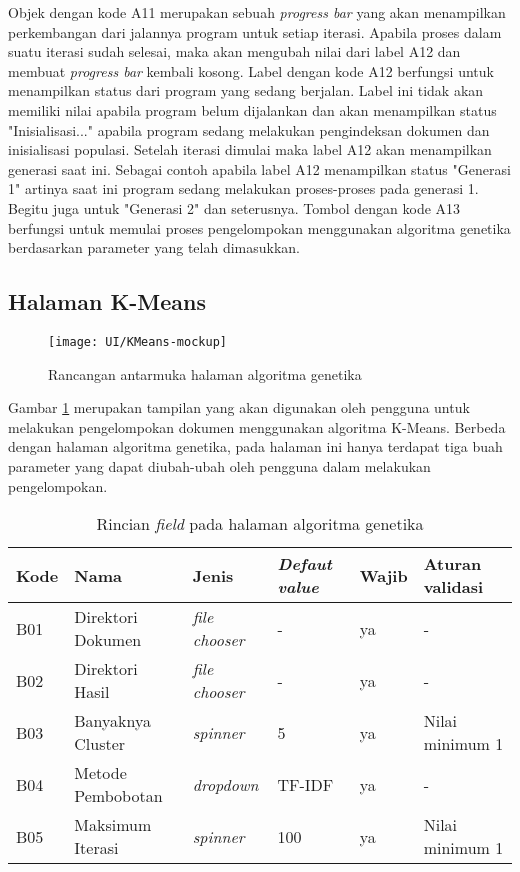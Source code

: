 Objek dengan kode A11 merupakan sebuah \textit{progress bar} yang akan menampilkan perkembangan dari jalannya program untuk setiap iterasi. Apabila proses dalam suatu iterasi sudah selesai, maka akan mengubah nilai dari label A12 dan membuat \textit{progress bar} kembali kosong. Label dengan kode A12 berfungsi untuk menampilkan status dari program yang sedang berjalan. Label ini tidak akan memiliki nilai apabila program belum dijalankan dan akan menampilkan status "Inisialisasi..." apabila program sedang melakukan pengindeksan dokumen dan inisialisasi populasi. Setelah iterasi dimulai maka label A12 akan menampilkan generasi saat ini. Sebagai contoh apabila label A12 menampilkan status "Generasi 1" artinya saat ini program sedang melakukan proses-proses pada generasi 1. Begitu juga untuk "Generasi 2" dan seterusnya. Tombol dengan kode A13 berfungsi untuk memulai proses pengelompokan menggunakan algoritma genetika berdasarkan parameter yang telah dimasukkan.

\subsection{Halaman K-Means}

\begin{figure}[H]
	\begin{center}
		\texttt{[image: UI/KMeans-mockup]}
		\caption{Rancangan antarmuka halaman algoritma genetika}
		\label{fig:UI-KMeans}
	\end{center}
\end{figure}

Gambar \ref{fig:UI-KMeans} merupakan tampilan yang akan digunakan oleh pengguna untuk melakukan pengelompokan dokumen menggunakan algoritma K-Means. Berbeda dengan halaman algoritma genetika, pada halaman ini hanya terdapat tiga buah parameter yang dapat diubah-ubah oleh pengguna dalam melakukan pengelompokan.

\begin{table}[H]
	\renewcommand{\arraystretch}{2}
	\begin{tabularx}{\textwidth}{l X l X l X} \hline
		\textbf{Kode} & \textbf{Nama} & \textbf{Jenis} & \textbf{\textit{Defaut value}} & \textbf{Wajib} & \textbf{Aturan validasi} \\ \hline
		B01 & Direktori Dokumen & \textit{file chooser} & - & ya & - \\ \hline
		B02 & Direktori Hasil & \textit{file chooser} & - & ya & - \\ \hline
		B03 & Banyaknya Cluster & \textit{spinner} & 5 & ya & Nilai minimum 1 \\ \hline
		B04 & Metode Pembobotan & \textit{dropdown} & TF-IDF & ya & - \\ \hline
		B05 & Maksimum Iterasi & \textit{spinner} & 100 & ya & Nilai minimum 1\\ \hline
	\end{tabularx}
	\caption{Rincian \textit{field} pada halaman algoritma genetika}
	\label{tbl:field-GA}
\end{table}

